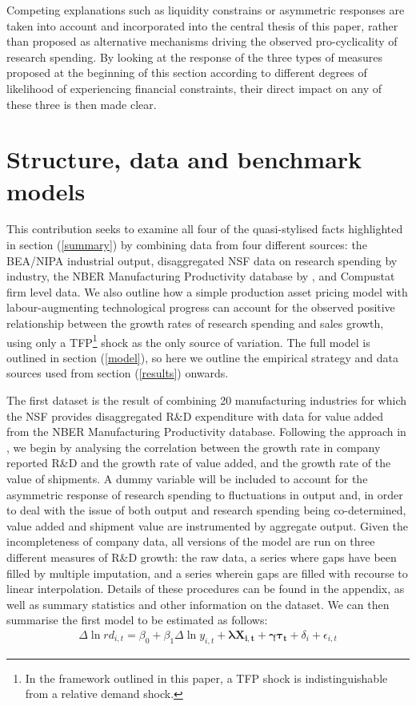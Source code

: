 \documentclass{_latex/house}
\begin{document}
Competing explanations such as liquidity constrains or asymmetric responses are taken into account and incorporated into the central thesis of this paper, rather than proposed as alternative mechanisms driving the observed pro-cyclicality of research spending. By looking at the response of the three types of measures proposed at the beginning of this section according to different degrees of likelihood of experiencing financial constraints, their direct impact on any of these three is then made clear.
\section{Structure, data and benchmark models} \label{structure}
This contribution seeks to examine all four of the quasi-stylised facts highlighted in section (\ref{summary}) by combining data from four different sources: the BEA/NIPA industrial output, disaggregated NSF data on research spending by industry, the NBER Manufacturing Productivity database by \cite{3931337}, and Compustat firm level data. We also outline how a simple production asset pricing model with labour-augmenting technological progress can account for the observed positive relationship between the growth rates of research spending and sales growth, using only a TFP\footnote{In the framework outlined in this paper, a TFP shock is indistinguishable from a relative demand shock.} shock as the only source of variation. The full model is outlined in section (\ref{model}), so here we outline the empirical strategy and data sources used from section (\ref{results}) onwards.

The first dataset is the result of combining 20 manufacturing industries for which the NSF provides disaggregated R\&D expenditure with data for value added from the NBER Manufacturing Productivity database. Following the approach in \cite{RePEc:tpr:restat:v:93:y:2011:i:2:p:542-553}, we begin by analysing the correlation between the growth rate in company reported R\&D and the growth rate of value added, and the growth rate of the value of shipments. A dummy variable will be included to account for the asymmetric response of research spending to fluctuations in output and, in order to deal with the issue of both output and research spending being co-determined, value added and shipment value are instrumented by aggregate output. Given the incompleteness of company data, all versions of the model are run on three different measures of R\&D growth: the raw data, a series where gaps have been filled by multiple imputation, and a series wherein gaps are filled with recourse to linear interpolation. Details of these procedures can be found in the appendix, as well as summary statistics and other information on the dataset. We can then summarise the first model to be estimated as follows:
\begin{align} \label{eq:eq1}
\Delta \ln rd_{i,t}=\beta_{0}+\beta_{1} \Delta \ln y_{i,t}+\boldsymbol{\lambda X_{i,t}}+\boldsymbol{\gamma \tau_{t}}+\delta_{i}+\epsilon_{i,t}
\end{align}
\end{document}
